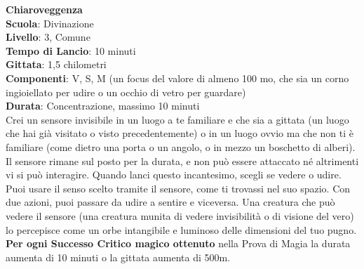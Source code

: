 \begin{multicols}{2}
\medskip\textbf{Chiaroveggenza}\\
\textbf{Scuola}: Divinazione\\
\textbf{Livello}: 3, Comune\\
\textbf{Tempo di Lancio}: 10 minuti\\
\textbf{Gittata}: 1,5 chilometri\\
\textbf{Componenti}: V, S, M (un focus del valore di almeno 100 mo, che sia un corno ingioiellato per udire o un occhio di vetro per guardare)\\
\textbf{Durata}: Concentrazione, massimo 10 minuti\\
Crei un sensore invisibile in un luogo a te familiare e che sia a gittata (un luogo che hai già visitato o visto precedentemente) o in un luogo ovvio ma che non ti è familiare (come dietro una porta o un angolo, o in mezzo un boschetto di alberi). Il sensore rimane sul posto per la durata, e non può essere attaccato né altrimenti vi si può interagire. Quando lanci questo incantesimo, scegli se vedere o udire. Puoi usare il senso scelto tramite il sensore, come ti trovassi nel suo spazio. Con due azioni, puoi passare da udire a sentire e viceversa. Una creatura che può vedere il sensore (una creatura munita di vedere invisibilità o di visione del vero) lo percepisce come un orbe intangibile e luminoso delle dimensioni del tuo pugno.\\
\textbf{Per ogni Successo Critico magico ottenuto} nella Prova di Magia la durata aumenta di 10 minuti o la gittata aumenta di 500m.


\end{multicols}
